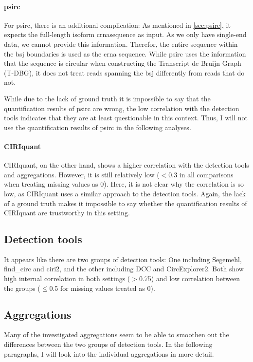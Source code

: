 \paragraph{psirc}
For psirc, there is an additional complication: As mentioned in
\cref{sec:psirc}, it expects the full-length isoform \gls{crna}sequence as
input.
As we only have single-end data, we cannot provide this information.
Therefor, the entire sequence within the \gls{bsj} boundaries is used as the
\gls{crna} sequence.
While psirc uses the information that the sequence is circular when
constructing the Transcript de Bruijn Graph (T-DBG), it does not treat reads
spanning the \gls{bsj} differently from reads that do
not\supercite{yu_quantifying_2021}.

While due to the lack of ground truth it is impossible to say that the
quantification results of psirc are wrong, the low correlation with the
detection tools indicates that they are at least questionable in this context.
Thus, I will not use the quantification results of psirc in the following
analyses.

\paragraph{CIRIquant}
CIRIquant, on the other hand, shows a higher correlation with the detection
tools and aggregations.
However, it is still relatively low ($<$0.3 in all comparisons when treating
missing values as 0).
Here, it is not clear why the correlation is so low, as CIRIquant uses a
similar approach to the detection tools.
Again, the lack of a ground truth makes it impossible to say whether the
quantification results of CIRIquant are trustworthy in this setting.

\subsection{Detection tools}
It appears like there are two groups of detection tools: One including
Segemehl, find\_circ and ciri2, and the other including DCC and CircExplorer2.
Both show high internal correlation in both settings ($>$0.75) and low
correlation between the groups ($\leq$0.5 for missing values treated as 0).


\subsection{Aggregations}
Many of the investigated aggregations seem to be able to smoothen out the
differences between the two groups of detection tools.
In the following paragraphs, I will look into the individual aggregations in
more detail.

